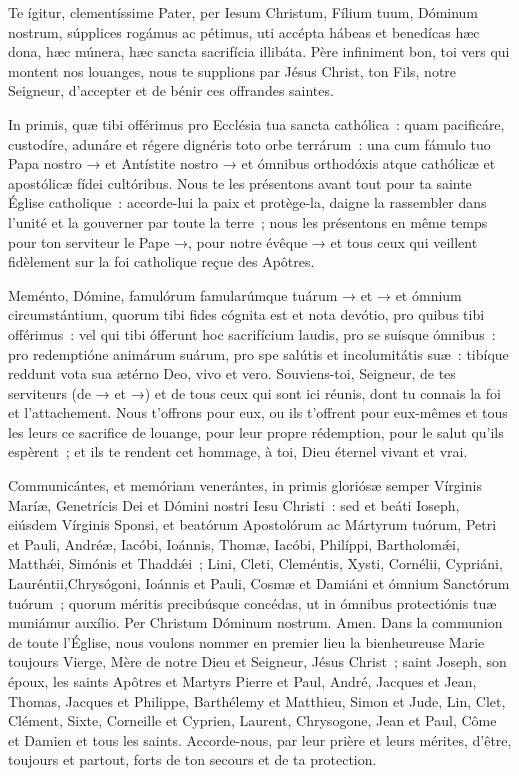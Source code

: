 \vspace{0.2cm}

\begin{paracol}{2}

\LigneParacol{0cm}
{Te ígitur, clementíssime Pater, per Iesum Christum, Fílium tuum, Dóminum nostrum, súpplices rogámus ac pétimus, uti accépta hábeas et benedícas hæc dona, hæc múnera, hæc sancta sacrifícia illibáta.}
{Père infiniment bon, toi vers qui mon\-tent nos louanges, nous te supplions par Jésus Christ, ton Fils, notre Seigneur, d'accepter et de bénir ces offrandes saintes.}

\LigneParacol{0cm}
{In primis, quæ tibi offérimus pro Ecclésia tua sancta cathólica~: quam pacificáre, custodíre, adunáre et régere dignéris toto orbe terrárum~: una cum fámulo tuo Papa nostro → et Antístite nostro → et ómnibus orthodóxis atque cathólicæ et apostólicæ fídei cultóribus.}
{Nous te les présentons avant tout pour ta sainte Église catholique~: accorde-lui la paix et protège-la, daigne la rassembler dans l'unité et la gouverner par toute la terre~; nous les présentons en même temps pour ton serviteur le Pape →, pour notre évêque → et tous ceux qui veillent fidèlement sur la foi catholique reçue des Apôtres.}

\LigneParacol{0cm}
{Meménto, Dómine, famulórum famularúmque tuárum → et → et ómnium circumstántium, quorum tibi fides cógnita est et nota devótio, pro quibus tibi offérimus~: vel qui tibi ófferunt hoc sacrifícium laudis, pro se suísque ómnibus~: pro redemptióne animárum suárum, pro spe salútis et incolumitátis suæ~: tibíque reddunt vota sua ætérno Deo, vivo et vero.}
{Souviens-toi, Seigneur, de tes serviteurs (de → et →) et de tous ceux qui sont ici réunis, dont tu connais la foi et l'attachement. Nous t'offrons pour eux, ou ils t'offrent pour eux-mêmes et tous les leurs ce sacrifice de louange, pour leur propre rédemption, pour le salut qu'ils espèrent~; et ils te rendent cet hommage, à toi, Dieu éternel vivant et vrai.}

\LigneParacol{0cm}
{Communicántes, et memóriam venerántes, in primis gloriósæ semper Vírginis Maríæ, Genetrícis Dei et Dómini nostri Iesu Christi~: sed et beáti Ioseph, eiúsdem Vírginis Sponsi, et beatórum Apostolórum ac Mártyrum tuórum, Petri et Pauli, Andréæ, Iacóbi, Ioánnis, Thomæ, Iacóbi, Philíppi, Bartholomǽi, Matthǽi, Simónis et Thaddǽi~; Lini, Cleti, Cleméntis, Xysti, Cornélii, Cypriáni, Lauréntii,Chrysógoni, Ioánnis et Pauli, Cosmæ et Damiáni et ómnium Sanctórum tuórum~; quorum méritis precibúsque concédas, ut in ómnibus protectiónis tuæ muniámur auxílio. Per Christum Dóminum nostrum. Amen.}
{Dans la communion de toute l'Église, nous voulons nommer en premier lieu la bienheureuse Marie toujours Vierge, Mère de notre Dieu et Seigneur, Jésus Christ~; saint Joseph, son époux, les saints Apôtres et Martyrs Pierre et Paul, André, Jacques et Jean, Thomas, Jacques et Philippe, Barthélemy et Matthieu, Simon et Jude, Lin, Clet, Clément, Sixte, Corneille et Cyprien, Laurent, Chrysogone, Jean et Paul, Côme et Damien et tous les saints. Accorde-nous, par leur prière et leurs mérites, d'être, toujours et partout, forts de ton secours et de ta protection.}


\end{paracol}
